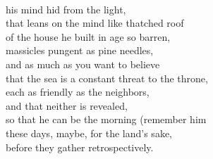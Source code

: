 \documentclass[smalldemyvopaper,11pt,twoside,onecolumn,openright,extrafontsizes]{memoir}
\begin{document}
\\his mind hid from the light,
\\that leans on the mind like thatched roof
\\of the house he built in age so barren,
\\massicles pungent as pine needles,
\\and as much as you want to believe
\\that the sea is a constant threat to the throne,
\\each as friendly as the neighbors,
\\and that neither is revealed,
\\so that he can be the morning (remember him
\\these days, maybe, for the land's sake,
\\before they gather retrospectively.
\end{document}
